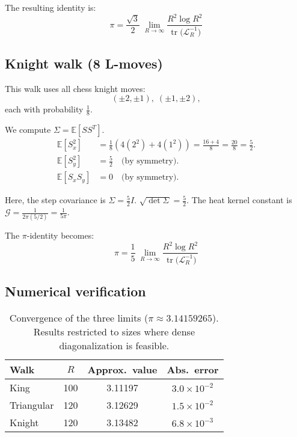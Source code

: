 \documentclass{article}
\numberwithin{equation}{section}
\theoremstyle{definition}
\theoremstyle{remark}
\newcommand{\cG}{\mathcal{G}}
\DeclareMathOperator{\tr}{tr}
\newcommand{\E}{\mathbb{E}}
\begin{document}
The resulting identity is:
\begin{equation}\label{eq:Tri_pi}
\boxed{\;\displaystyle \pi=\frac{\sqrt{3}}{2}\;\lim_{R\to\infty}\frac{R^{2}\log R^{2}}{\tr\!\bigl(\mathcal{L}_R^{-1}\bigr)}\;}
\end{equation}


\subsection{Knight walk (8 L-moves)}\label{app:knight}

This walk uses all chess knight moves:
\[
(\pm2,\pm1),\;(\pm1,\pm2),
\]
each with probability \( \tfrac{1}{8} \).

We compute $\Sigma = \E[S S^T]$.
\begin{align*}
\E[S_x^2] &= \frac{1}{8} \left( 4(2^2) + 4(1^2) \right) = \frac{16+4}{8} = \frac{20}{8} = \frac{5}{2}. \\
\E[S_y^2] &= \frac{5}{2} \quad \text{(by symmetry)}. \\
\E[S_x S_y] &= 0 \quad \text{(by symmetry)}.
\end{align*}

Here, the step covariance is \( \Sigma = \tfrac{5}{2} I \). $\sqrt{\det\Sigma} = \frac{5}{2}$.
The heat kernel constant is $\cG = \frac{1}{2\pi(5/2)} = \frac{1}{5\pi}$.

The $\pi$-identity becomes:
\begin{equation}\label{eq:Knight_pi}
\boxed{\;\displaystyle \pi=\frac{1}{5}\;\lim_{R\to\infty}\frac{R^{2}\log R^{2}}{\tr\!\bigl(\mathcal{L}_R^{-1}\bigr)}\;}
\end{equation}


\subsection{Numerical verification}\label{app:numerical}

\begin{table}[h]
\centering
\caption{Convergence of the three limits ($\pi\approx3.14159265$). Results restricted to sizes where dense diagonalization is feasible.}
\label{tab:numeric_pi}
\begin{tabular}{@{}lccc@{}}
\toprule
Walk & $R$ & Approx.\ value & Abs.\ error \\
\midrule
King & 100 & 3.11197 & $3.0 \times 10^{-2}$ \\
\addlinespace
Triangular & 120 & 3.12629 & $1.5\times10^{-2}$ \\
\addlinespace
Knight & 120 & 3.13482 & $6.8\times10^{-3}$ \\
\bottomrule
\end{tabular}
\end{table}
\end{document}
